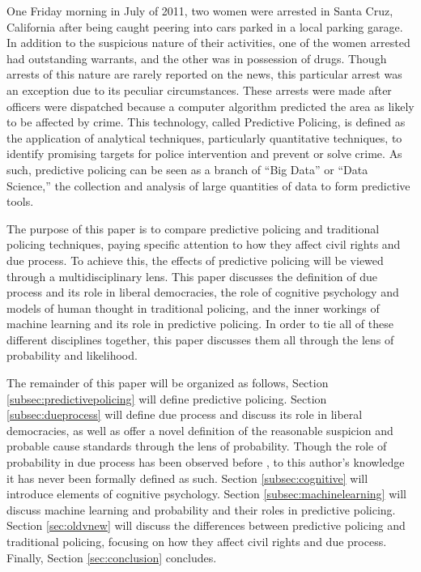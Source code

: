 \documentclass[12pt]{article} %
\begin{document}
One Friday morning in July of 2011, two women were arrested in Santa Cruz, California after being caught peering into cars parked in a local parking garage. In addition to the suspicious nature of their activities, one of the women arrested had outstanding warrants, and the other was in possession of drugs. Though arrests of this nature are rarely reported on the news, this particular arrest was an exception due to its peculiar circumstances. These arrests were made after officers were dispatched because a computer algorithm predicted the area as likely to be affected by crime. \cite{nyt} 
This technology, called Predictive Policing, is defined as the application of analytical techniques, particularly quantitative techniques, to identify promising targets for police intervention and prevent or solve crime. \cite{perryetal} As such, predictive policing can be seen as a branch of ``Big Data'' or ``Data Science,'' the collection and analysis of large quantities of data to form predictive tools.

The purpose of this paper is to compare predictive policing and traditional policing techniques, paying specific attention to how they affect civil rights and due process. To achieve this, the effects of predictive policing will be viewed through a multidisciplinary lens. This paper discusses the definition of due process and its role in liberal democracies, the role of cognitive psychology and models of human thought in traditional policing, and the inner workings of machine learning and its role in predictive policing. In order to tie all of these different disciplines together, this paper discusses them all through the lens of probability and likelihood.

The remainder of this paper will be organized as follows, Section \ref{subsec:predictivepolicing} will define predictive policing. Section \ref{subsec:dueprocess} will define due process and discuss its role in liberal democracies, as well as offer a novel definition of the reasonable suspicion and probable cause standards through the lens of probability. Though the role of probability in due process has been observed before \cite{ferguson2012predictive}, to this author's knowledge it has never been formally defined as such. Section \ref{subsec:cognitive} will introduce elements of cognitive psychology. Section \ref{subsec:machinelearning} will discuss machine learning and probability and their roles in predictive policing. Section \ref{sec:oldvnew} will discuss the differences between predictive policing and traditional policing, focusing on how they affect civil rights and due process. Finally, Section \ref{sec:conclusion} concludes.
\end{document}
